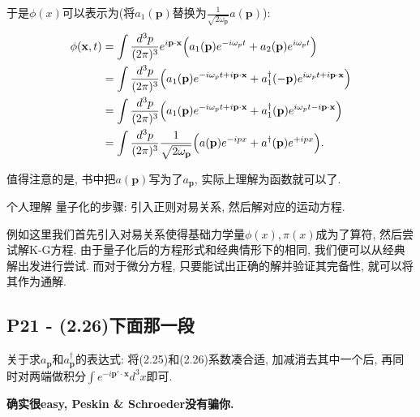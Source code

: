 于是$\phi(x)$可以表示为(将$a_1(\mathbf{p})$替换为$\frac{1}{\sqrt{2\omega_\mathbf{p}}} a(\mathbf{p})$):
\begin{equation}
  \begin{aligned}
    \phi(\mathbf{x}, t) & = \int \frac{d^3 p}{(2\pi)^3}e^{i\mathbf{p \cdot x}}\Bigl(a_1(\mathbf{p})e^{-i\omega_p t} + a_2(\mathbf{p})e^{i\omega_p t}\Bigr)                                \\
                        & = \int \frac{d^3 p}{(2\pi)^3}\Bigl(a_1(\mathbf{p})e^{-i\omega_p t +i\mathbf{p \cdot x}} + a_1^{\dagger}(-\mathbf{p})e^{i\omega_p t+i\mathbf{p \cdot x}}\Bigr)   \\
                        & = \int \frac{d^3 p}{(2\pi)^3}\Bigl(a_1(\mathbf{p})e^{-i\omega_p t + i\mathbf{p \cdot x}} + a_1^{\dagger}(\mathbf{p})e^{i\omega_p t - i\mathbf{p \cdot x}}\Bigr) \\
                        & = \int \frac{d^3 p}{(2\pi)^3} \frac{1}{\sqrt{2 \omega_\mathbf{p}}} \Bigl(a(\mathbf{p})e^{-ipx} + a^{\dagger}(\mathbf{p})e^{+ipx}\Bigr).
  \end{aligned}
\end{equation}

值得注意的是, 书中把$a(\mathbf{p})$写为了$a_\mathbf{p}$, 实际上理解为函数就可以了.

\begin{mybox}{个人理解}
  量子化的步骤: 引入正则对易关系, 然后解对应的运动方程.

  例如这里我们首先引入对易关系使得基础力学量$\phi(x),\pi(x)$成为了算符, 然后尝试解K-G方程.
  由于量子化后的方程形式和经典情形下的相同, 我们便可以从经典解出发进行尝试.
  而对于微分方程, 只要能试出正确的解并验证其完备性, 就可以将其作为通解.
\end{mybox}

\subsection{P21 - (2.26)下面那一段}

关于求$a_\mathbf{p}$和$a^{\dagger}_\mathbf{p}$的表达式: 将(2.25)和(2.26)系数凑合适, 加减消去其中一个后, 再同时对两端做积分$\int e^{-i\mathbf{p'\cdot x}} d^3 x$即可.

\begin{mybox}{}
  \begin{center}
    \large \bfseries 确实很easy, Peskin \& Schroeder没有骗你.
  \end{center}
\end{mybox}


